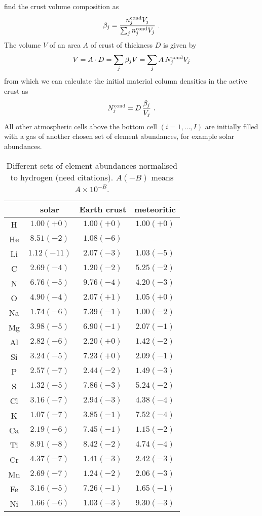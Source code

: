 \documentclass[11pt]{article}
\begin{document}
find the crust volume composition as
\begin{equation}
  \beta_j = \frac{n_j^{\rm cond} V_j}{\sum_j n_j^{\rm cond} V_j} \ .
\end{equation}
The volume $V$ of an area $A$ of crust of thickness $D$ is given by 
\begin{equation}
  V = A\cdot D = \sum_j \beta_j V = \sum_j A\,N_j^{\rm cond} V_j
\end{equation}
from which we can calculate the initial material column densities in
the active crust as
\begin{equation}
  N_j^{\rm cond} = D\,\frac{\beta_j}{V_j} \ .
\end{equation}
All other atmospheric cells above the bottom cell $(i=1,...,I)$ are
initially filled with a gas of another chosen set of element
abundances, for example solar abundances.

\begin{table}
\centering
\caption{Different sets of element abundances normalised to hydrogen
  (need citations). $A(-B)$ means $A\times 10^{-B}$.}
\label{tab:eps}
\vspace*{2mm}
\begin{tabular}{cccc}
\hline
     &     solar & Earth crust & meteoritic \\
\hline
 H   & $1.00(+0)$ &   $1.00(+0)$ &   $1.00(+0)$ \\
 He  & $8.51(-2)$ &   $1.08(-6)$ &   -- \\
 Li  & $1.12(-11)$ &  $2.07(-3)$ &   $1.03(-5)$ \\
 C   & $2.69(-4)$ &   $1.20(-2)$ &   $5.25(-2)$ \\
 N   & $6.76(-5)$ &   $9.76(-4)$ &   $4.20(-3)$ \\
 O   & $4.90(-4)$ &   $2.07(+1)$ &   $1.05(+0)$ \\
 Na  & $1.74(-6)$ &   $7.39(-1)$ &   $1.00(-2)$ \\
 Mg  & $3.98(-5)$ &   $6.90(-1)$ &   $2.07(-1)$ \\
 Al  & $2.82(-6)$ &   $2.20(+0)$ &   $1.42(-2)$ \\
 Si  & $3.24(-5)$ &   $7.23(+0)$ &   $2.09(-1)$ \\
 P   & $2.57(-7)$ &   $2.44(-2)$ &   $1.49(-3)$ \\
 S   & $1.32(-5)$ &   $7.86(-3)$ &   $5.24(-2)$ \\
 Cl  & $3.16(-7)$ &   $2.94(-3)$ &   $4.38(-4)$ \\
 K   & $1.07(-7)$ &   $3.85(-1)$ &   $7.52(-4)$ \\
 Ca  & $2.19(-6)$ &   $7.45(-1)$ &   $1.15(-2)$ \\
 Ti  & $8.91(-8)$ &   $8.42(-2)$ &   $4.74(-4)$ \\
 Cr  & $4.37(-7)$ &   $1.41(-3)$ &   $2.42(-3)$ \\
 Mn  & $2.69(-7)$ &   $1.24(-2)$ &   $2.06(-3)$ \\
 Fe  & $3.16(-5)$ &   $7.26(-1)$ &   $1.65(-1)$ \\
 Ni  & $1.66(-6)$ &   $1.03(-3)$ &   $9.30(-3)$ \\
\hline
\end{tabular}
\end{table}
\end{document}
